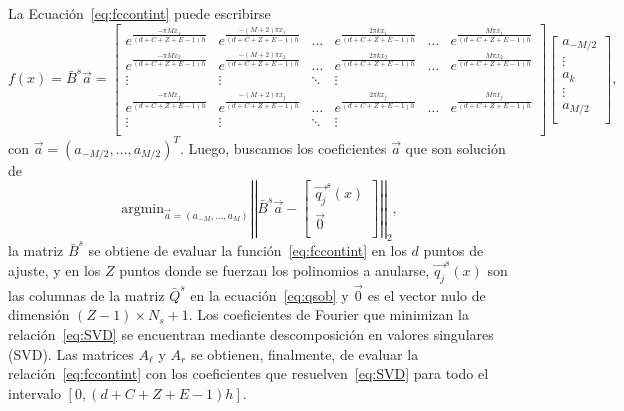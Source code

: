 La Ecuación~\eqref{eq:fccontint} puede escribirse
\begin{equation*}
f(x)=\bar{B}^s \vec{a}=
\begin{bmatrix}
    e^{\frac{-\pi M x_1}{(d+C+Z+E-1)h}}  & e^{\frac{-(M+2)\pi  x_1}{(d+C+Z+E-1)h}} & \dots & 
    e^{\frac{2\pi k x_1}{(d+C+Z+E-1)h}}  & \dots  & e^{\frac{M \pi  x_1}{(d+C+Z+E-1)h}} \\
    e^{\frac{-\pi M x_2}{(d+C+Z+E-1)h}}  & e^{\frac{-(M+2)\pi  x_2}{(d+C+Z+E-1)h}}  & \dots & 
    e^{\frac{2\pi k x_2}{(d+C+Z+E-1)h}}  & \dots  & e^{\frac{M \pi  x_2}{(d+C+Z+E-1)h}} \\
    \vdots  & \vdots & \ddots & \vdots \\
    e^{\frac{-\pi M x_j}{(d+C+Z+E-1)h}}  & e^{\frac{-(M+2)\pi  x_j}{(d+C+Z+E-1)h}}  & \dots & 
    e^{\frac{2\pi k x_j}{(d+C+Z+E-1)h}}  & \dots & e^{\frac{M \pi  x_j}{(d+C+Z+E-1)h}} \\
    \vdots  & \vdots & \ddots & \vdots \\
\end{bmatrix}
\begin{bmatrix}
    a_{-M/2}\\
    \vdots\\
    a_k\\
    \vdots\\
    a_{M/2} \\
\end{bmatrix},
\label{eq:fccontint2}
\end{equation*}
con $\vec{a}=(a_{-M/2},\ldots,a_{M/2})^T$. 
Luego, buscamos los coeficientes $\vec{a}$ que son solución de 
\begin{equation}
\text{argmin}_{\vec{a}=(a_{-M},\ldots,a_M)} \left | \left|\bar{B}^s \vec{a}-
\begin{bmatrix}
    \vec{q_j}^s(x)\\
    \vec{0} \\
\end{bmatrix}
\right|\right|_2,
\label{eq:SVD}
\end{equation}
la matriz $\bar{B}^s$ se obtiene 
de evaluar la función~\eqref{eq:fccontint} en los $d$ puntos de ajuste, y en los $Z$ puntos donde se fuerzan los polinomios a anularse, $ \vec{q_j}^s(x)$ son las columnas 
de la matriz $\bar{Q}^s$ en la ecuación~\eqref{eq:qsob} y $\vec{0}$ es el vector nulo de dimensión $(Z-1)\times N_s +1$. Los coeficientes de Fourier que minimizan la relación~\eqref{eq:SVD} se encuentran mediante descomposición en valores singulares (SVD). 
Las matrices $A_{\ell}$ y $A_r$ se obtienen, finalmente, de evaluar la relación~\eqref{eq:fccontint} con los coeficientes que resuelven~\eqref{eq:SVD} 
para todo el intervalo $[0,(d+C+Z+E-1)h]$.


